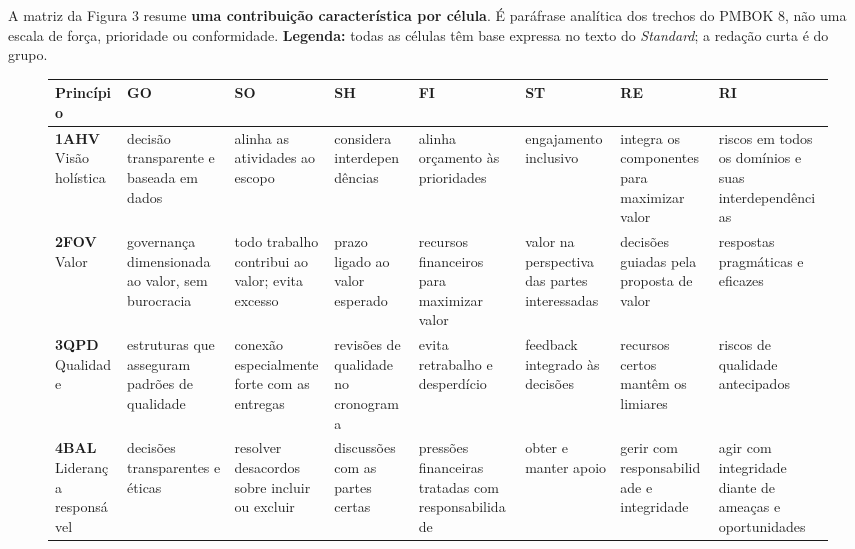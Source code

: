 \documentclass[11pt,a4paper]{article}
\newcommand{\SingleSpacing}{}
\begin{document}
A matriz da Figura 3 resume \textbf{uma contribuição característica por célula}. É paráfrase analítica dos trechos do PMBOK 8, não uma escala de força, prioridade ou conformidade. \textbf{Legenda:} todas as células têm base expressa no texto do \textit{Standard}; a redação curta é do grupo.

\begin{figure}[!htbp]
\centering

\begingroup\SingleSpacing\scriptsize
\begin{tabular}{@{}>{\raggedright\arraybackslash}p{}>{\raggedright\arraybackslash}p{}>{\raggedright\arraybackslash}p{}>{\raggedright\arraybackslash}p{}>{\raggedright\arraybackslash}p{}>{\raggedright\arraybackslash}p{}>{\raggedright\arraybackslash}p{}>{\raggedright\arraybackslash}p{}@{}}
\midrule
\textbf{Princípio} & \textbf{GO} & \textbf{SO} & \textbf{SH} & \textbf{FI} & \textbf{ST} & \textbf{RE} & \textbf{RI}\\
\midrule
\rowcolor{bandaProativa}\textbf{1AHV} Visão holística & decisão transparente e baseada em dados & alinha as atividades ao escopo & considera interdependências & alinha orçamento às prioridades & engajamento inclusivo & integra os componentes para maximizar valor & riscos em todos os domínios e suas interdependências\\
\rowcolor{bandaValor}\textbf{2FOV} Valor & governança dimensionada ao valor, sem burocracia & todo trabalho contribui ao valor; evita excesso & prazo ligado ao valor esperado & recursos financeiros para maximizar valor & valor na perspectiva das partes interessadas & decisões guiadas pela proposta de valor & respostas pragmáticas e eficazes\\
\rowcolor{bandaProativa}\textbf{3QPD} Qualidade & estruturas que asseguram padrões de qualidade & conexão especialmente forte com as entregas & revisões de qualidade no cronograma & evita retrabalho e desperdício & feedback integrado às decisões & recursos certos mantêm os limiares & riscos de qualidade antecipados\\
\rowcolor{bandaResp}\textbf{4BAL} Liderança responsável & decisões transparentes e éticas & resolver desacordos sobre incluir ou excluir & discussões com as partes certas & pressões financeiras tratadas com responsabilidade & obter e manter apoio & gerir com responsabilidade e integridade & agir com integridade diante de ameaças e oportunidades\\

\end{tabular}
\end{figure}
\end{document}
